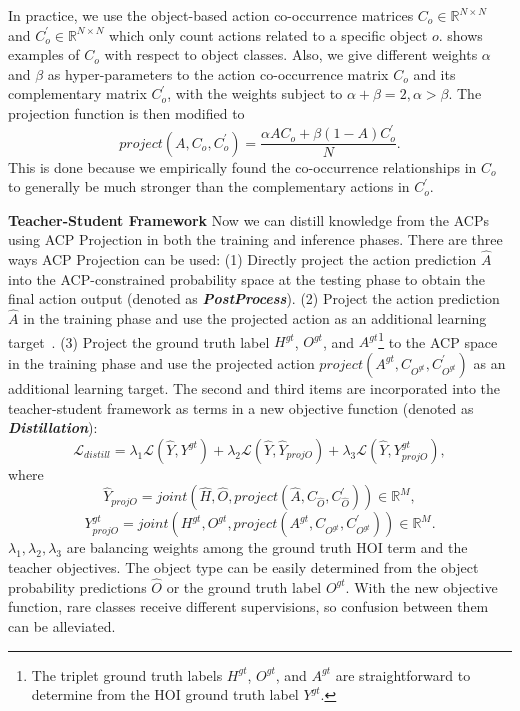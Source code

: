 In practice, we use the object-based action co-occurrence matrices $C_{o}\in\mathbb{R}^{N\times N}$ and $C_{o}^{'}\in\mathbb{R}^{N\times N}$ which only count actions related to a specific object $o$.  shows examples of $C_{o}$ with respect to object classes.
Also, we give different weights $\alpha$ and $\beta$ {as hyper-parameters} to the action co-occurrence matrix $C_{o}$ and its complementary matrix $C_{o}^{'}$, with the weights subject to $\alpha + \beta = 2,\alpha > \beta$.
The projection function is then modified to
\begin{equation}
project(A, C_{o}, C^{'}_{o}) = \dfrac{\alpha AC_{o} + \beta (1-A)C^{'}_{o}}{N}.
\end{equation}
This is done because we empirically found the co-occurrence relationships in $C_{o}$ to generally be much stronger than the complementary actions in $C^{'}_{o}$. 


\noindent\textbf{Teacher-Student Framework} Now we can distill knowledge from the ACPs using ACP Projection in both the training and inference phases. There are three ways ACP Projection can be used:
(1) Directly project the action prediction $\hat{A}$ into the ACP-constrained probability space at the testing phase to obtain the final action output (denoted as \emph{\textbf{PostProcess}}). 
(2) Project the action prediction $\hat{A}$ in the training phase and use the projected action as an additional learning target~\cite{hu2016harnessing,yu2017visual}.
(3) Project the ground truth label $H^{gt}$, $O^{gt}$, and $A^{gt}$\footnote{The triplet ground truth labels $H^{gt}$, $O^{gt}$, and $A^{gt}$ are straightforward to determine from the HOI ground truth label $Y^{gt}$.} to the ACP space in the training phase and use the projected action $project(A^{gt}, C_{{O}^{gt}}, C_{{O}^{gt}}^{'})$ as an additional learning target.
The second and third items are incorporated into the teacher-student framework as terms in a new objective function {(denoted as \emph{\textbf{Distillation}})}:
\begin{equation}
\mathcal{L}_{distill} = \lambda_1 \mathcal{L}(\hat{Y}, Y^{gt}) + \lambda_2 \mathcal{L}(\hat{Y}, \hat{Y}_{projO}) + \lambda_3 \mathcal{L}(\hat{Y}, Y^{gt}_{projO}),
\label{eqn:distill_loss}
\end{equation}
where
\begin{equation}
\hat{Y}_{projO} = joint(\hat{H}, \hat{O}, project(\hat{A}, C_{\hat{O}}, C_{\hat{O}}^{'}))  \in \mathbb{R}^{M},
\label{eqn:teacher2_self}
\end{equation}
\begin{equation}
Y^{gt}_{projO} = joint({H}^{gt},{O}^{gt},project(A^{gt}, C_{{O}^{gt}}, C_{{O}^{gt}}^{'}))  \in \mathbb{R}^{M}.
\label{eqn:teacher2_gt}
\end{equation}
$\lambda_1, \lambda_2, \lambda_3$ are balancing weights among the ground truth HOI term and the teacher objectives.
The object type can be easily determined from the object probability predictions $\hat{O}$ or the ground truth label ${O}^{gt}$.
With the new objective function, rare classes receive different supervisions, so confusion between them can be alleviated.






